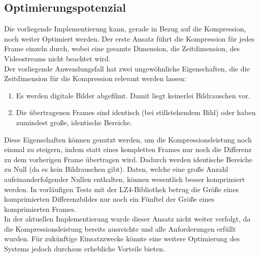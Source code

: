 \subsection{Optimierungspotenzial}
Die vorliegende Implementierung kann, gerade in Bezug auf die Kompression, noch weiter Optimiert werden. Der erste Ansatz führt die Kompression für jedes Frame einzeln durch, wobei eine gesamte Dimension, die Zeitdimension, des Videostreams nicht beachtet wird.\\
Der vorliegende Anwendungsfall hat zwei ungewöhnliche Eigenschaften, die die Zeitdimension für die Kompression relevant werden lassen:
\begin{enumerate}
\item{Es werden digitale Bilder abgefilmt. Damit liegt keinerlei Bildrauschen vor.}
\item{Die übertragenen Frames sind identisch (bei stillstehendem Bild) oder haben zumindest große, identische Bereiche.}
\end{enumerate}

Diese Eigenschaften können genutzt werden, um die Kompressionsleistung noch einmal zu steigern, indem statt eines kompletten Frames nur noch die Differenz zu dem vorherigen Frame übertragen wird. Dadurch werden identische Bereiche zu Null (da es kein Bildrauschen gibt). Daten, welche eine große Anzahl aufeinanderfolgender Nullen enthalten, können wesentlich besser komprimiert werden. In vorläufigen Tests mit der LZ4-Bibliothek betrug die Größe eines komprimierten Differenzbildes nur noch ein Fünftel der Größe eines komprimierten Frames.\\
In der aktuellen Implementierung wurde dieser Ansatz nicht weiter verfolgt, da die Kompressionsleistung bereits ausreichte und alle Anforderungen erfüllt wurden. Für zukünftige Einsatzzwecke könnte eine weitere Optimierung des Systems jedoch durchaus erhebliche Vorteile bieten.

